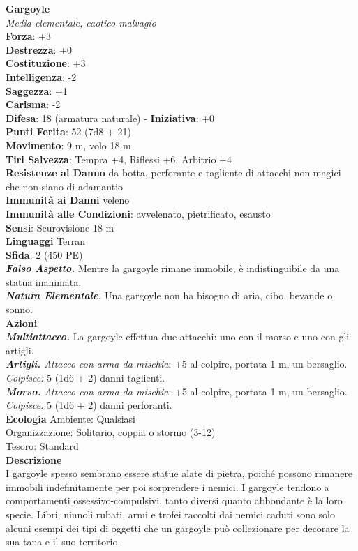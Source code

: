 \begin{multicols}{2}
\medskip\textbf{Gargoyle}\\
\emph{Media elementale, caotico malvagio}\\
\textbf{Forza}: +3\\
\textbf{Destrezza}: +0\\
\textbf{Costituzione}: +3\\
\textbf{Intelligenza}: -2\\
\textbf{Saggezza}: +1\\
\textbf{Carisma}: -2\\
\textbf{Difesa}: 18 (armatura naturale) - \textbf{Iniziativa}: +0\\
\textbf{Punti Ferita}: 52 (7d8 + 21)\\
\textbf{Movimento}: 9 m, volo 18 m\\
\textbf{Tiri Salvezza}: Tempra +4, Riflessi +6, Arbitrio +4\\
\textbf{Resistenze al Danno} da botta, perforante e tagliente di attacchi non magici che non siano di adamantio\\
\textbf{Immunità ai Danni} veleno\\
\textbf{Immunità alle Condizioni}: avvelenato, pietrificato, esausto\\
\textbf{Sensi}: Scurovisione 18 m\\
\textbf{Linguaggi} Terran\\
\textbf{Sfida}: 2 (450 PE)\smallskip\\
\emph{\textbf{Falso Aspetto.}} Mentre la gargoyle rimane immobile, è indistinguibile da una statua inanimata.\\
\emph{\textbf{Natura Elementale.}} Una gargoyle non ha bisogno di aria, cibo, bevande o sonno.\\
\smallskip\textbf{Azioni}\\
\emph{\textbf{Multiattacco.}} La gargoyle effettua due attacchi: uno con il morso e uno con gli artigli.\\
\emph{\textbf{Artigli.} Attacco con arma da mischia}: +5 al colpire, portata 1 m, un bersaglio.\\
\emph{Colpisce:} 5 (1d6 + 2) danni taglienti.\\
\emph{\textbf{Morso.} Attacco con arma da mischia}: +5 al colpire, portata 1 m, un bersaglio.\\
\emph{Colpisce:} 5 (1d6 + 2) danni perforanti.\\
\textbf{Ecologia}
Ambiente: Qualsiasi\\
Organizzazione: Solitario, coppia o stormo (3-12)\\
Tesoro: Standard\\
\textbf{Descrizione}\\
I gargoyle spesso sembrano essere statue alate di pietra, poiché possono rimanere immobili indefinitamente per poi sorprendere i nemici. I gargoyle tendono a comportamenti ossessivo-compulsivi, tanto diversi quanto abbondante è la loro specie. Libri, ninnoli rubati, armi e trofei raccolti dai nemici caduti sono solo alcuni esempi dei tipi di oggetti che un gargoyle può collezionare per decorare la sua tana e il suo territorio.\\


\end{multicols}
